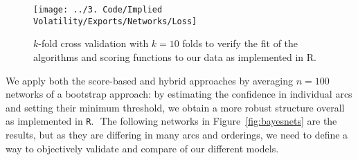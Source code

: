 \documentclass[twoside,twocolumn]{article}
\begin{document}
\begin{figure}[H]
\centering
\texttt{[image: ../3. Code/Implied Volatility/Exports/Networks/Loss]}
  \caption[$k$-fold cross validation]{$k$-fold cross validation with $k = 10$ folds to verify the fit of the algorithms and scoring functions to our data as implemented in R.}
  \label{fig:loss}
\end{figure}

We apply both the score-based and hybrid approaches by averaging $n = 100$ networks of a bootstrap approach: by estimating the confidence in individual arcs and setting their minimum threshold, we obtain a more robust structure overall as implemented in \texttt{R}. ­­ The following networks in Figure~\ref{fig:bayesnets} are the results, but as they are differing in many arcs and orderings, we need to define a way to objectively validate and compare of our different models.\cite{Nagarajan2014}  \cite{Scutari2022}  \cite{Imoto2002} \cite{Friedman1999}
\end{document}
